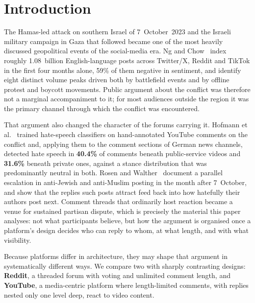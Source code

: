 \section{Introduction}
The Hamas-led attack on southern Israel of 7~October~2023 and the Israeli military
campaign in Gaza that followed became one of the most heavily discussed
geopolitical events of the social-media era. Ng and Chow~\cite{ngchow2025} index
roughly 1.08~billion English-language posts across Twitter/X, Reddit and TikTok in
the first four months alone, 59\% of them negative in sentiment, and identify eight
distinct volume peaks driven both by battlefield events and by offline protest and
boycott movements. Public argument about the conflict was therefore not a marginal
accompaniment to it; for most audiences outside the region it was the primary
channel through which the conflict was encountered.

That argument also changed the character of the forums carrying it. Hofmann
et al.~\cite{hofmann2026} trained hate-speech classifiers on hand-annotated YouTube
comments on the conflict and, applying them to the comment sections of German news
channels, detected hate speech in \textbf{40.4\%} of comments beneath public-service
videos and \textbf{31.6\%} beneath private ones, against a stance distribution that
was predominantly neutral in both. Rosen and Walther~\cite{rosen2025} document a
parallel escalation in anti-Jewish and anti-Muslim posting in the month after
7~October, and show that the replies such posts attract feed back into how
hatefully their authors post next.
Comment threads that ordinarily host reaction became a venue for
sustained partisan dispute, which is precisely the material this paper analyses:
not what participants believe, but how the argument is organised once a platform's
design decides who can reply to whom, at what length, and with what visibility.

Because platforms differ in architecture, they may shape that argument in
systematically different ways. We compare two with sharply contrasting designs:
\textbf{Reddit}, a threaded forum with voting and unlimited comment length, and
\textbf{YouTube}, a media-centric platform where length-limited comments, with replies
nested only one level deep, react to video content.

